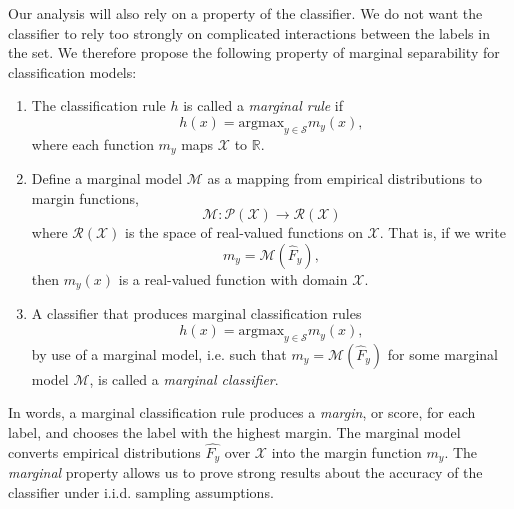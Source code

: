 Our analysis will also rely on a property of the classifier. We do not
want the classifier to rely too strongly on complicated interactions
between the labels in the set. We therefore propose the following
property of marginal separability for classification models:

\begin{definition}
\begin{enumerate}
\item The classification rule $h$ is called a \emph{marginal rule} if 
\[
h(x) = \text{argmax}_{y \in \mathcal{S}} m_y(x),
\]
where each function $m_y$ maps $\mathcal{X}$ to $\mathbb{R}$. 
\item Define a marginal model $\mathcal{M}$ as a mapping from empirical distributions
to margin functions,
\[
\mathcal{M}: \mathcal{P}(\mathcal{X}) \to \mathcal{R}(\mathcal{X})
\]
where $\mathcal{R}(\mathcal{X})$ is the space of real-valued functions on $\mathcal{X}$.
That is, if we write
\[
m_y = \mathcal{M}(\hat{F}_y),
\]
then $m_y(x)$ is a real-valued function with domain $\mathcal{X}$.
\item A classifier that produces marginal classification rules
\[
h(x) = \text{argmax}_{y \in \mathcal{S}} m_y(x),
\]
by use of a marginal model, i.e. such that
$m_y=\mathcal{M}(\hat{F}_y)$ for some marginal model $\mathcal{M}$,
is called a \emph{marginal classifier}.
\end{enumerate}
\end{definition}
In words, a marginal classification rule produces a \emph{margin}, or
score, for each label, and chooses the label with the highest
margin. The marginal model converts empirical distributions
$\hat{F_y}$ over $\mathcal{X}$ into the margin function
$m_y$.  The \emph{marginal} property allows us to prove strong results
about the accuracy of the classifier under i.i.d. sampling assumptions.


